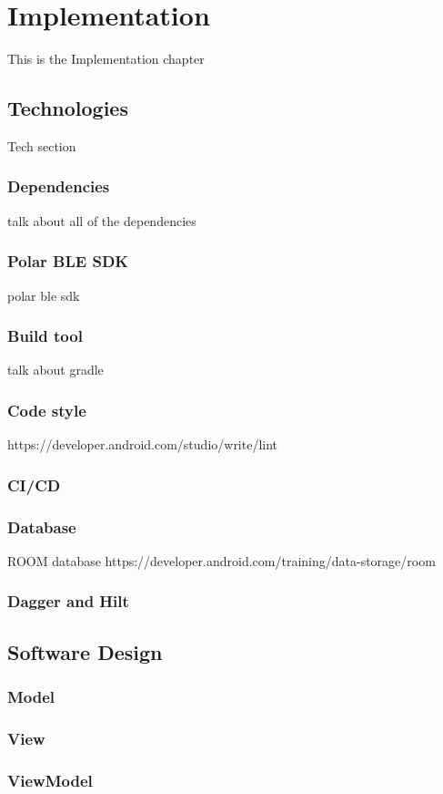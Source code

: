 \chapter{Implementation}

This is the Implementation chapter 

\section{Technologies}
Tech section
\subsection{Dependencies}
talk about all of the dependencies
\subsection{Polar BLE SDK}
polar ble sdk
\subsection{Build tool}
talk about gradle\
\subsection{Code style}
https://developer.android.com/studio/write/lint
\subsection{CI/CD}
\subsection{Database}
ROOM database 
https://developer.android.com/training/data-storage/room
\subsection{Dagger and Hilt}

\section{Software Design}
\subsection{Model}
\subsection{View}
\subsection{ViewModel}


